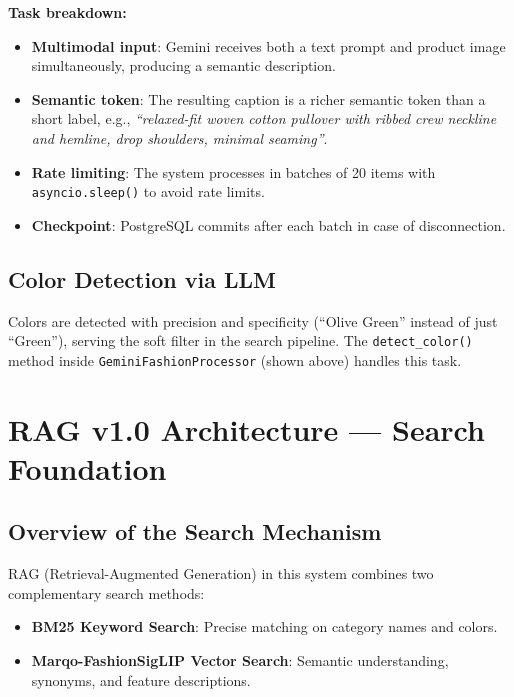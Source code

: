 \documentclass[12pt, twoside]{report}
\begin{document}
\textbf{Task breakdown:}
\begin{itemize}
    \item \textbf{Multimodal input}: Gemini receives both a text prompt and product image simultaneously, producing a semantic description.
    \item \textbf{Semantic token}: The resulting caption is a richer semantic token than a short label, e.g., \textit{``relaxed-fit woven cotton pullover with ribbed crew neckline and hemline, drop shoulders, minimal seaming''}.
    \item \textbf{Rate limiting}: The system processes in batches of 20 items with \texttt{asyncio.sleep()} to avoid rate limits.
    \item \textbf{Checkpoint}: PostgreSQL commits after each batch in case of disconnection.
\end{itemize}

\section{Color Detection via LLM}
Colors are detected with precision and specificity (``Olive Green'' instead of just ``Green''), serving the soft filter in the search pipeline. The \texttt{detect\_color()} method inside \texttt{GeminiFashionProcessor} (shown above) handles this task.

\chapter{RAG v1.0 Architecture --- Search Foundation}

\section{Overview of the Search Mechanism}
RAG (Retrieval-Augmented Generation) in this system combines two complementary search methods:

\begin{itemize}
    \item \textbf{BM25 Keyword Search}: Precise matching on category names and colors.
    \item \textbf{Marqo-FashionSigLIP Vector Search}: Semantic understanding, synonyms, and feature descriptions.
\end{itemize}
\end{document}
